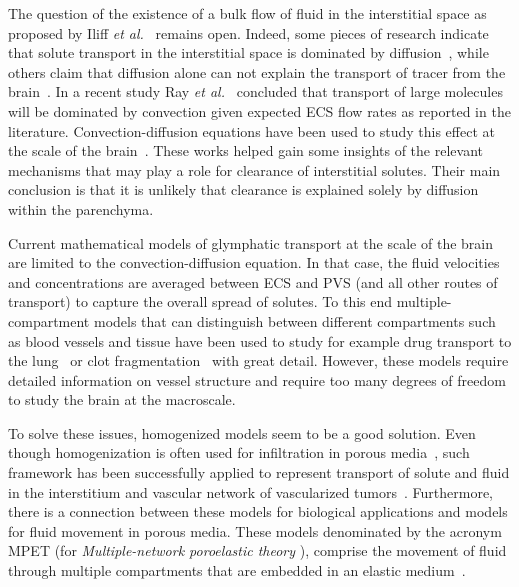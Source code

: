 \documentclass[10pt,letterpaper]{article}
\newcommand{\etal}{\emph{et al.}\;}
\newcommand{\1}{^{(1)}}
\newcommand{\2}{^{(2)}}
\begin{document}
The question of the existence of a bulk flow of fluid in the interstitial space as proposed by Iliff \etal~\cite{Iliff_2012_PVS} remains open. Indeed, some pieces of research indicate that solute transport in the interstitial space is dominated by diffusion~\cite{asgari_glymphatic_2016, Holter9894, smith2019going}, while others claim that diffusion alone can not explain the transport of tracer from the brain~\cite{valnes_apparent_2020, ray2021quantitative}. In a recent study Ray \etal~\cite{ray_analysis_2019} concluded that transport of large molecules will be dominated by convection given expected ECS flow rates as reported in the literature. Convection-diffusion equations have been used to study this effect at the scale of the brain~\cite{ray_analysis_2019,valnes_apparent_2020,Holter9894,nicholson-1981-ion, stoverud_modeling_2012, ray2021quantitative, croci2019uncertainty}. These works helped gain some insights of the relevant mechanisms that may play a role for clearance of interstitial solutes. Their main conclusion is that it is unlikely that clearance is explained solely by diffusion within the parenchyma.   

Current mathematical models of glymphatic transport at the scale of the brain are limited to the convection-diffusion equation. In that case, the fluid velocities and concentrations are averaged between ECS and PVS (and all other routes of transport) to capture the overall spread of solutes. To this end multiple-compartment models that can distinguish between different compartments such as blood vessels and tissue have been used to study for example drug transport to the lung~\cite{Erbertseder-2012-lung} or clot fragmentation~\cite{Payne-clot-2021} with great detail. However, these models require detailed information on vessel structure and require too many degrees of freedom to study the brain at the macroscale. 

To solve these issues, homogenized models seem to be a good solution. Even though homogenization is often used for infiltration in porous media~\cite{Hornung-1996-homogenization}, such framework has been successfully applied to represent transport of solute and fluid in the interstitium and vascular network of vascularized tumors~\cite{ shipley_multiscale_2010,shipley-four-comp, Penta-homogenization-2015}.   
Furthermore, there is a connection between these models for biological applications and models for fluid movement in porous media. These models denominated by the acronym MPET (for \textit{Multiple-network poroelastic theory }), comprise the movement of fluid through multiple compartments that are embedded in an elastic medium~\cite{Biot-1941-Consolidation,Biot-1955-Consolidation2, Bai-MPET-1993,tully_ventikos_2011,Vardakis-2016-cerebral,Guo-2018-MPET,Guo-2019-MPET}.
\end{document}
